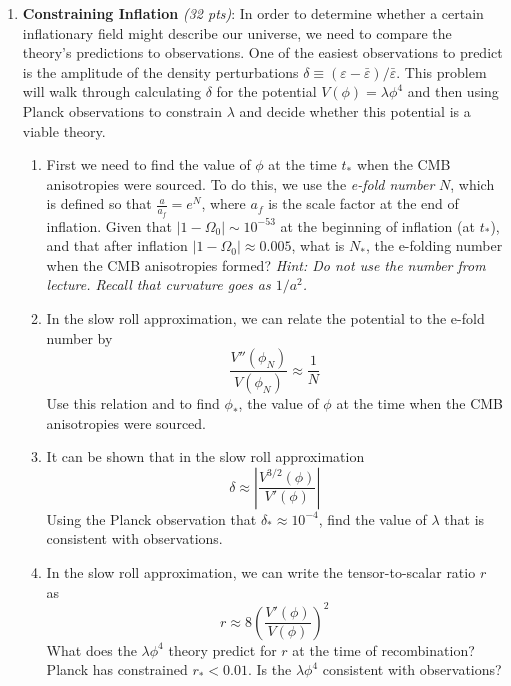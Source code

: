 \documentclass[12pt,preprint]{aastex}
\def\K{\mathrm{K}}
\def\eps{\varepsilon}
\newcommand\sn[2]{#1 \times 10^{#2}}
\begin{document}
\begin{enumerate}
\item \textbf{Constraining Inflation} \textit{(32 pts)}: In order to determine whether a certain inflationary field might describe our universe, we need to compare the theory's predictions to observations. One of the easiest observations to predict is the amplitude of the density perturbations $\delta \equiv (\eps - \bar \eps)/\bar\eps$. This problem will walk through calculating $\delta$ for the potential $V(\phi) = \lambda \phi^4$ and then using Planck observations to constrain $\lambda$ and decide whether this potential is a viable theory. 
	\begin{enumerate}
	\item First we need to find the value of $\phi$ at the time $t_*$ when the CMB anisotropies were sourced. To do this, we use the \textit{e-fold number} $N$, which is defined so that $\frac{a}{a_f} = e^N$, where $a_f$ is the scale factor at the end of inflation. Given that $|1-\Omega_0| \sim 10^{-53}$ at the beginning of inflation (at $t_*$), and that after inflation $|1-\Omega_0| \approx 0.005$, what is $N_*$, the e-folding number when the CMB anisotropies formed? \textit{Hint: Do not use the number from lecture. Recall that curvature goes as $1/a^2$.}
	\item In the slow roll approximation, we can relate the potential to the e-fold number by 
	$$\frac{V''(\phi_N)}{V(\phi_N)} \approx \frac{1}{N}$$
	Use this relation and to find $\phi_*$, the value of $\phi$ at the time when the CMB anisotropies were sourced.
	\item It can be shown that in the slow roll approximation 
	$$\delta \approx \left | \frac{V^{3/2}(\phi)}{V'(\phi)} \right |$$
	Using the Planck observation that $\delta_* \approx 10^{-4}$, find the value of $\lambda$ that is consistent with observations. 
	\item In the slow roll approximation, we can write the tensor-to-scalar ratio $r$ as 
	$$r \approx 8 \left( \frac{V'(\phi)}{V(\phi)} \right)^2$$
	What does the $\lambda\phi^4$ theory predict for $r$ at the time of recombination? Planck has constrained $r_*<0.01$. Is the $\lambda\phi^4$ consistent with observations? 
	\end{enumerate}

\end{enumerate}
\end{document}
